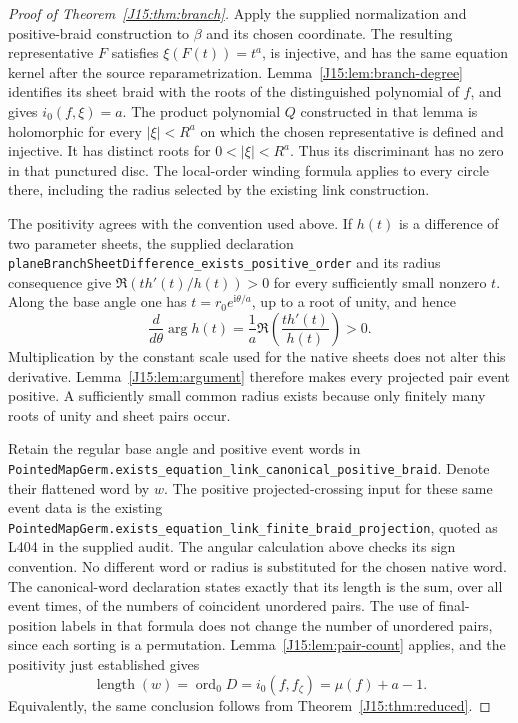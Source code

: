 \documentclass[11pt,oneside]{report}
\theoremstyle{definition}
\numberwithin{equation}{section}
\newcommand{\decl}[1]{\textnormal{\nolinkurl{#1}}}
\newcommand{\ord}{\operatorname{ord}}
\newcommand{\length}{\operatorname{length}}
\newcommand{\ii}{\mathrm i}
\begin{document}
\begin{proof}[Proof of Theorem~\ref{J15:thm:branch}]
Apply the supplied normalization and positive-braid construction to
$\beta$ and its chosen coordinate. The resulting representative $F$
satisfies $\xi(F(t))=t^a$, is injective, and has the same equation
kernel after the source reparametrization. Lemma~\ref{J15:lem:branch-degree}
identifies its sheet braid with the roots of the distinguished polynomial
of $f$, and gives $i_0(f,\xi)=a$. The product polynomial $Q$ constructed
in that lemma is holomorphic for every $|\xi|<R^a$ on which the chosen
representative is defined and injective. It has distinct roots for
$0<|\xi|<R^a$. Thus its discriminant has no zero in that punctured
disc. The local-order winding formula applies to every circle there,
including the radius selected by the existing link construction.

The positivity agrees with the convention used above. If $h(t)$ is a
difference of two parameter sheets, the supplied declaration
\decl{planeBranchSheetDifference_exists_positive_order} and its
radius consequence give
$\Re(t h'(t)/h(t))>0$ for every sufficiently small nonzero $t$.
Along the base angle one has $t=r_0e^{\ii\theta/a}$, up to a root of
unity, and hence
\[
 \frac d{d\theta}\arg h(t)
   =\frac1a\Re\left(\frac{t h'(t)}{h(t)}\right)>0.
\]
Multiplication by the constant scale used for the native sheets does not
alter this derivative. Lemma~\ref{J15:lem:argument} therefore makes every
projected pair event positive. A sufficiently small common radius exists
because only finitely many roots of unity and sheet pairs occur.

Retain the regular base angle and positive event words in
\decl{PointedMapGerm.exists_equation_link_canonical_positive_braid}.
Denote their flattened word by $w$. The positive projected-crossing
input for these same event data is the existing
\decl{PointedMapGerm.exists_equation_link_finite_braid_projection},
quoted as L404 in the supplied audit. The angular calculation above
checks its sign convention. No different word or radius is substituted
for the chosen native word.
The canonical-word declaration states exactly that its length is the sum, over
all event times, of the numbers of coincident unordered pairs. The use of
final-position labels in that formula does not change the number of
unordered pairs, since each sorting is a permutation.
Lemma~\ref{J15:lem:pair-count} applies, and the positivity just established
gives
\[
 \length(w)=\ord_0 D=i_0(f,f_\zeta)=\mu(f)+a-1.
\]
Equivalently, the same conclusion follows from Theorem~\ref{J15:thm:reduced}.


\end{proof}
\end{document}
